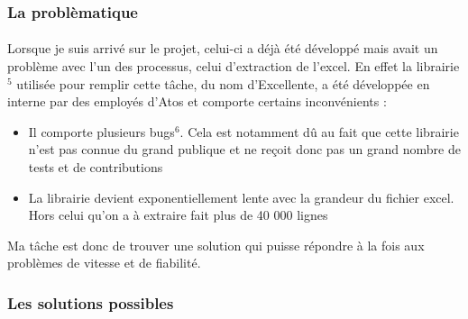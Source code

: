 \documentclass[12pt]{article}
\begin{document}
\begin {sloppypar}
\subsubsection{La problèmatique}
\paragraph {}
Lorsque je suis arrivé sur le projet, celui-ci a déjà été développé mais avait un 
problème avec l'un des processus, celui d'extraction de l'excel. En effet la librairie$^{5}$
utilisée pour remplir cette tâche, du nom d'Excellente, a été développée en interne par des 
employés d'Atos et comporte certains inconvénients : 
\begin{itemize}
  \item 
    Il comporte plusieurs bugs$^{6}$. Cela est notamment dû au fait que cette librairie 
    n'est pas connue du grand publique et ne reçoit donc pas un grand nombre de tests et 
    de contributions 
  \item 
    La librairie devient exponentiellement lente avec la grandeur du fichier excel. Hors
    celui qu'on a à extraire fait plus de 40 000 lignes
\end{itemize}
Ma tâche est donc de trouver une solution qui puisse répondre à la fois aux problèmes
de vitesse et de fiabilité.
\newpage
\subsubsection{Les solutions possibles}

\end{sloppypar}
\end{document}
